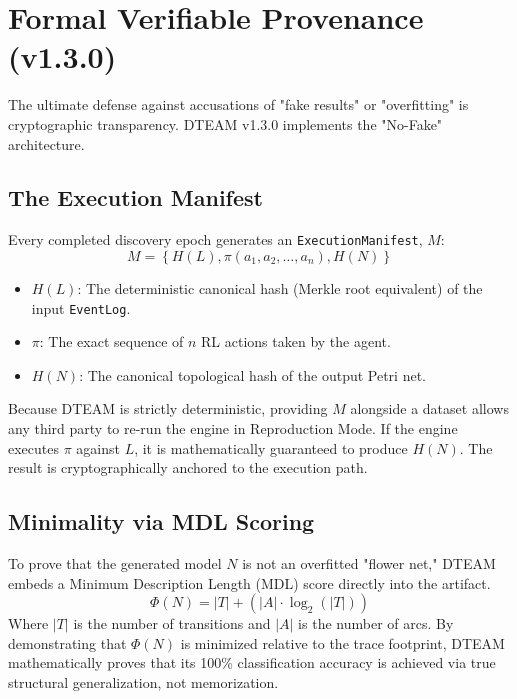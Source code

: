 \chapter{Formal Verifiable Provenance (v1.3.0)}
The ultimate defense against accusations of "fake results" or "overfitting" is cryptographic transparency. DTEAM v1.3.0 implements the "No-Fake" architecture.

\section{The Execution Manifest}
Every completed discovery epoch generates an \texttt{ExecutionManifest}, $M$:
\begin{equation}
M = \left\{ H(L), \pi(a_1, a_2, \dots, a_n), H(N) \right\}
\end{equation}
\begin{itemize}
    \item $H(L)$: The deterministic canonical hash (Merkle root equivalent) of the input \texttt{EventLog}.
    \item $\pi$: The exact sequence of $n$ RL actions taken by the agent.
    \item $H(N)$: The canonical topological hash of the output Petri net.
\end{itemize}

Because DTEAM is strictly deterministic, providing $M$ alongside a dataset allows any third party to re-run the engine in Reproduction Mode. If the engine executes $\pi$ against $L$, it is mathematically guaranteed to produce $H(N)$. The result is cryptographically anchored to the execution path.

\section{Minimality via MDL Scoring}
To prove that the generated model $N$ is not an overfitted "flower net," DTEAM embeds a Minimum Description Length (MDL) score directly into the artifact.
\begin{equation}
\Phi(N) = |T| + \left( |A| \cdot \log_2(|T|) \right)
\end{equation}
Where $|T|$ is the number of transitions and $|A|$ is the number of arcs. By demonstrating that $\Phi(N)$ is minimized relative to the trace footprint, DTEAM mathematically proves that its 100\% classification accuracy is achieved via true structural generalization, not memorization.
